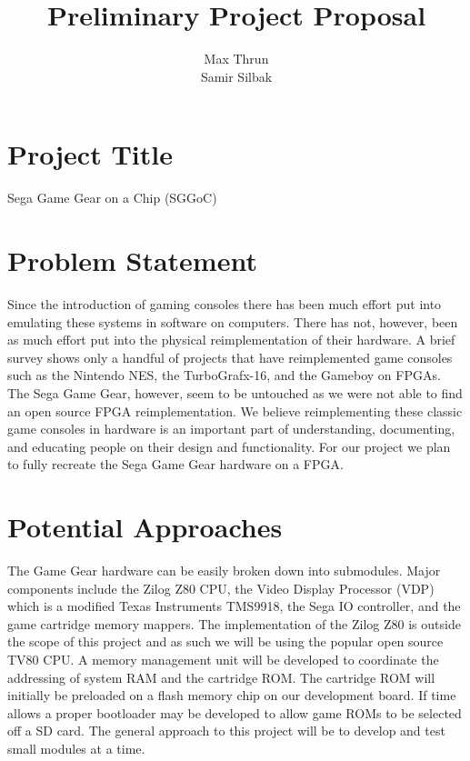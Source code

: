 \documentclass[12pt]{article}
\title{Preliminary Project Proposal}
\author{ Max Thrun \\ Samir Silbak }
\begin{document}
\maketitle

\section*{Project Title}
Sega Game Gear on a Chip (SGGoC)

\section*{Problem Statement}
Since the introduction of gaming consoles there has been
much effort put into emulating these systems in software on computers. 
There has not, however, been as much effort put into the physical reimplementation of their hardware.
A brief survey shows only a handful of projects that have reimplemented game consoles such as the Nintendo NES, 
the TurboGrafx-16, and the Gameboy on FPGAs. The Sega Game Gear, however, seem to be untouched as we were not
able to find an open source FPGA reimplementation. We believe reimplementing these classic game consoles in hardware
is an important part of understanding, documenting, and educating people on their design and functionality. For our project we plan to fully recreate the Sega Game Gear hardware on a FPGA.

\section*{Potential Approaches}
The Game Gear hardware can be easily broken down into submodules. Major components include the Zilog Z80 CPU, 
the Video Display Processor (VDP) which is a modified Texas Instruments TMS9918, the Sega IO controller, and the
game cartridge memory mappers. The implementation of the Zilog Z80 is outside the scope of this project and as such
we will be using the popular open source TV80 CPU. A memory management unit will be developed to coordinate the 
addressing of system RAM and the cartridge ROM. The cartridge ROM will initially be preloaded on a flash memory chip on
our development board. If time allows a proper bootloader may be developed to allow game ROMs to be selected off a
SD card. The general approach to this project will be to develop and test small modules at a time.
\end{document}
